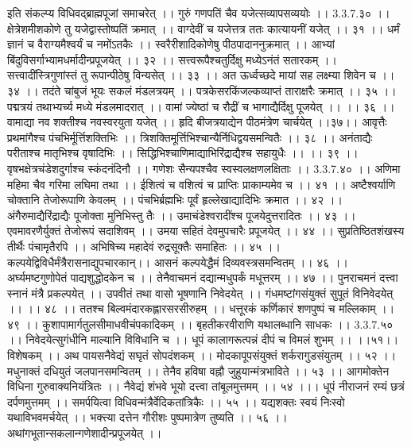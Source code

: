 इति संकल्प्य विधिवद्ब्राह्मपूजां समाचरेत् ।।
गुरुं गणपतिं चैव यजेत्सव्यापसव्ययोः ।। 3.3.7.३० ।।
क्षेत्रेशमीशकोणे तु यजेद्वास्तोष्पतिं क्रमात् ।।
वाग्देवीं च यजेत्तत्र ततः कात्यायनीं यजेत् ।। ३१ ।।
धर्मं ज्ञानं च वैराग्यमैश्वर्यं च नमोंऽतकैः ।।
स्वरैरीशादिकोणेषु पीठपादाननुक्रमात् ।।
आभ्यां बिंदुविसर्गाभ्यामधर्मादीन्प्रपूजयेत् ।। ३२ ।।
सत्त्वरूपैश्चतुर्दिक्षु मध्येऽनंतं सतारकम् ।।
सत्त्वादींस्त्रिगुणांस्तं तु रूपान्पीठेषु विन्यसेत् ।। ३३ ।।
अत ऊर्ध्वच्छदे मायां सह लक्ष्म्या शिवेन च ।। ३४ ।।
तदंते चांबुजं भूयः सकलं मंडलत्रयम् ।।
पत्रकेसरकिंजल्कव्याप्तं ताराक्षरैः क्रमात् ।। ३५ ।।
पद्मत्रयं तथाभ्यर्च्य मध्ये मंडलमादरात् ।।
वामां ज्येष्ठां च रौद्रीं च भागाद्यैर्दिक्षु पूजयेत् ।। ।। ३६ ।।
वामाद्या नव शक्तीश्च नवस्वरयुता यजेत् ।।
हृदि बीजत्रयाद्येन पीठमंत्रेण चार्चयेत् ।।३७।।
आवृत्तैः प्रथमांगैश्च पंचभिर्मूर्त्तिशक्तिभिः ।।
त्रिशक्तिमूर्त्तिभिश्चान्यैर्निधिद्वयसमन्वितैः ।। ३८ ।।
अनंताद्यैः परीताश्च मातृभिश्च वृषादिभिः ।।
सिद्धिभिश्चाणिमाद्याभिरिंद्राद्यैश्च सहायुधैः ।। ।। ३९ ।।
वृषभक्षेत्रचंडेशदुर्गाश्च स्कंदनंदिनौ ।।
गणेशः सैन्यपश्चैव स्वस्वलक्षणलक्षिताः ।। 3.3.7.४० ।।
अणिमा महिमा चैव गरिमा लघिमा तथा ।।
ईशित्वं च वशित्वं च प्राप्तिः प्राकाम्यमेव च ।। ४१ ।।
अष्टैश्वर्याणि चोक्तानि तेजोरूपाणि केवलम् ।।
पंचभिर्ब्रह्मभिः पूर्वं हृल्लेखाद्यादिभिः क्रमात ।। ४२ ।।
अंगैरुमाद्यैरिंद्राद्यैः पूजोक्ता मुनिभिस्तु तैः ।।
उमाचंडेश्वरादींश्च पूजयेदुत्तरादितः ।। ४३ ।।
एवमावरणैर्युक्तं तेजोरूपं सदाशिवम् ।।
उमया सहितं देवमुपचारैः प्रपूजयेत् ।। ४४ ।।
सुप्रतिष्ठितशंखस्य तीर्थैः पंचामृतैरपि ।।
अभिषिच्य महादेवं रुद्रसूक्तैः समाहितः ।। ४५ ।।
कल्पयेद्विविधैर्मंत्रैरासनाद्युपचारकान्।।
आसनं कल्पयेद्धैमं दिव्यवस्त्रसमन्वितम् ।। ४६ ।।
अर्घ्यमष्टगुणोपेतं पाद्यशुद्धोदकेन च ।।
तेनैवाचमनं दद्यान्मधुपर्कं मधूत्तरम् ।। ४७ ।।
पुनराचमनं दत्त्वा स्नानं मंत्रै प्रकल्पयेत् ।।
उपवीतं तथा वासो भूषणानि निवेदयेत् ।।
गंधमष्टांगसंयुक्तं सुपूतं विनिवेदयेत् ।। ।। ४८ ।।
ततश्च बिल्वमंदारकह्लारसरसीरुहम् ।।
धत्तूरकं कर्णिकारं शणपुष्पं च मल्लिकाम् ।। ४९ ।।
कुशापामार्गतुलसीमाधवीचंपकादिकम् ।।
बृहतीकरवीराणि यथालब्धानि साधकः ।। 3.3.7.५० ।।
निवेदयेत्सुगंधीनि माल्यानि विविधानि च ।।
धूपं कालागरूत्पन्नं दीपं च विमलं शुभम् ।। ।।५१।।
विशेषकम् ।।
अथ पायसनैवेद्यं सघृतं सोपदंशकम् ।।
मोदकापूपसंयुक्तं शर्करागुडसंयुतम् ।। ५२ ।।
मधुनाक्तं दधियुतं जलपानसमन्वितम् ।।
तेनैव हविषा वह्नौ जुहुयान्मंत्रभाविते ।। ५३ ।।
आगमोक्तेन विधिना गुरुवाक्यनियंत्रितः ।।
नैवेद्यं शंभवे भूयो दत्त्वा तांबूलमुत्तमम् ।। ५४ ।।।
धूपं नीराजनं रम्यं छत्रं दर्पणमुत्तमम् ।।
समर्पयित्वा विधिवन्मंत्रैर्वेदिकतांत्रिकैः ।। ५५ ।।
यद्यशक्तः स्वयं निःस्वो यथाविभवमर्चयेत् ।।
भक्त्त्या दत्तेन गौरीशः पुष्पमात्रेण तुष्यति ।। ५६ ।।
अथांगभूतान्सकलान्गणेशादीन्प्रपूजयेत् ।।

